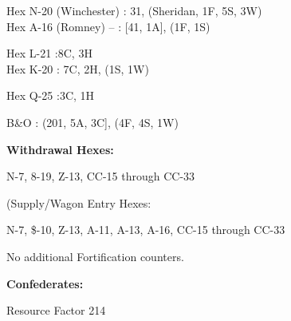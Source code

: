 \begin{scenariodata}
Hex N-20 (Winchester) : 31, (Sheridan, 1F, 5S, 3W)\\
Hex A-16 (Romney) -- : [41, 1A], (1F, 1S)\\
\end{scenariodata}

\begin{scenariodata}
Hex L-21 :8C, 3H\\
Hex K-20 : 7C, 2H, (1S, 1W)\\
\end{scenariodata}

\begin{scenariodata}
Hex Q-25 :3C, 1H\\
\end{scenariodata}

\begin{scenariodata}
B\&O : (201, 5A, 3C], (4F, 4S, 1W)\\
\end{scenariodata}

\begin{scenariodata}
\textbf{Withdrawal Hexes:}\\
\end{scenariodata}

\begin{scenariodata}
N-7, 8-19, Z-13, CC-15 through CC-33\\
\end{scenariodata}

\begin{scenariodata}
(Supply/Wagon Entry Hexes:\\
\end{scenariodata}

\begin{scenariodata}
N-7, \$-10, Z-13, A-11, A-13, A-16, CC-15 through CC-33\\
\end{scenariodata}

\begin{scenariodata}
No additional Fortification counters.\\
\end{scenariodata}

\begin{scenariodata}
\textbf{Confederates:}\\
\end{scenariodata}

\begin{scenariodata}
Resource Factor 214\\
\end{scenariodata}

